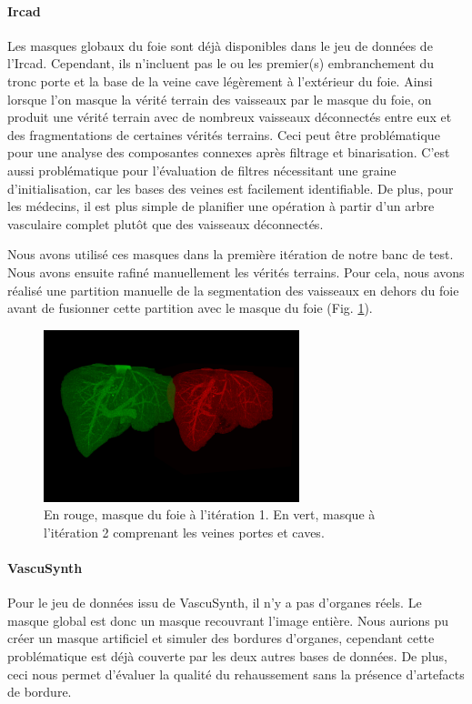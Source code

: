 \paragraph{Ircad}
Les masques globaux du foie sont déjà disponibles dans le jeu de données de l'Ircad. Cependant, ils n'incluent pas le ou les premier(s) embranchement du tronc porte et la base de la veine cave légèrement à l'extérieur du foie. Ainsi lorsque l'on masque la vérité terrain des vaisseaux par le masque du foie, on produit une vérité terrain avec de nombreux vaisseaux déconnectés entre eux et des fragmentations de certaines vérités terrains. Ceci peut être problématique pour une analyse des composantes connexes après filtrage et binarisation. C'est aussi problématique pour l'évaluation de filtres nécessitant une graine d'initialisation, car les bases des veines est facilement identifiable. De plus, pour les médecins, il est plus simple de planifier une opération à partir d'un arbre vasculaire complet plutôt que des vaisseaux déconnectés.

Nous avons utilisé ces masques dans la première itération de notre banc de test. Nous avons ensuite rafiné manuellement les vérités terrains. Pour cela, nous avons réalisé une partition manuelle de la segmentation des vaisseaux en dehors du foie avant de fusionner cette partition avec le masque du foie (Fig. \ref{fig:masques_globaux_ircad}).

\begin{figure}[h]
  \centering
  \includegraphics[height=5cm]{Images/ircad_corrected_gt.png}
  \caption{En rouge, masque du foie à l'itération 1. En vert, masque à l'itération 2 comprenant les veines portes et caves.}
  \label{fig:masques_globaux_ircad}
\end{figure}

\paragraph{VascuSynth}
Pour le jeu de données issu de VascuSynth, il n'y a pas d'organes réels. Le masque global est donc un masque recouvrant l'image entière. Nous aurions pu créer un masque artificiel et simuler des bordures d'organes, cependant cette problématique est déjà couverte par les deux autres bases de données. De plus, ceci nous permet d'évaluer la qualité du rehaussement sans la présence d'artefacts de bordure.

